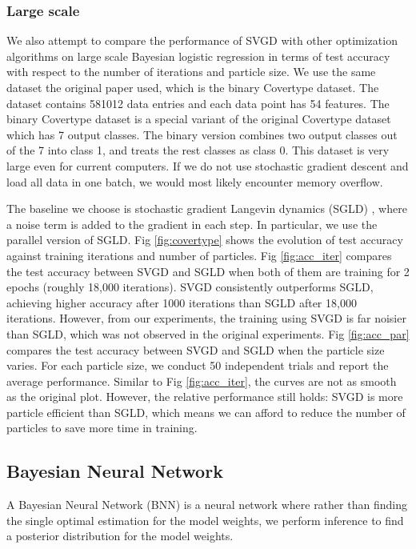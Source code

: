 

\subsubsection{Large scale}
We also attempt to compare the performance of SVGD with other optimization algorithms on large scale Bayesian logistic regression in terms of test accuracy with respect to the number of iterations and particle size. We use the same dataset the original paper used, which is the binary Covertype dataset. The dataset contains 581012 data entries and each data point has 54 features. The binary Covertype dataset is a special variant of the original Covertype dataset which has 7 output classes. The binary version combines two output classes out of the 7 into class 1, and treats the rest classes as class 0. This dataset is very large even for current computers. If we do not use stochastic gradient descent and load all data in one batch, we would most likely encounter memory overflow. 

The baseline we choose is stochastic gradient Langevin dynamics (SGLD) \cite{ref_sgld}, where a noise term is added to the gradient in each step. In particular, we use the parallel version of SGLD. Fig \ref{fig:covertype} shows the evolution of test accuracy against training iterations and number of particles. Fig \ref{fig:acc_iter} compares the test accuracy between SVGD and SGLD when both of them are training for 2 epochs (roughly 18,000 iterations). SVGD consistently outperforms SGLD, achieving higher accuracy after 1000 iterations than SGLD after 18,000 iterations. However, from our experiments, the training using SVGD is far noisier than SGLD, which was not observed in the original experiments. Fig \ref{fig:acc_par} compares the test accuracy between SVGD and SGLD when the particle size varies. For each particle size, we conduct 50 independent trials and report the average performance. Similar to Fig \ref{fig:acc_iter}, the curves are not as smooth as the original plot. However, the relative performance still holds: SVGD is more particle efficient than SGLD, which means we can afford to reduce the number of particles to save more time in training.


\subsection{Bayesian Neural Network}

A Bayesian Neural Network (BNN) is a neural network where rather than finding the single optimal estimation for the model weights, we perform inference to find a posterior distribution for the model weights.

